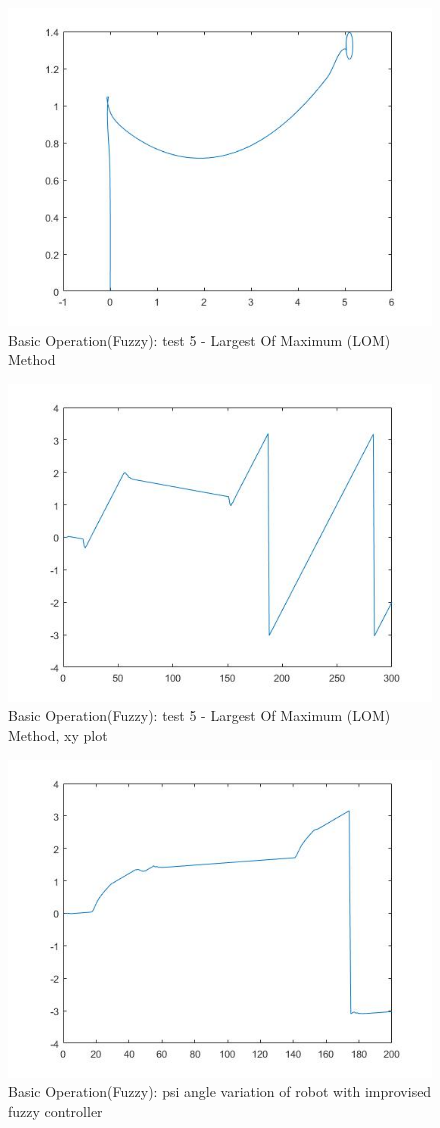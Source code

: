 \documentclass{l4proj}
\begin{document}
\begin{figure}[htb]
    \centering
    \includegraphics[width=0.5\linewidth]{images/lofig2.jpg}

    \caption{Basic Operation(Fuzzy): test 5 - Largest Of Maximum (LOM) Method}
    \label{fig:Model1sim4} 
\end{figure}
\begin{figure}[htb]
    \centering
    \includegraphics[width=0.5\linewidth]{images/lofig4.jpg}

    \caption{Basic Operation(Fuzzy): test 5 - Largest Of Maximum (LOM) Method, xy plot}
    \label{fig:Model1sim4} 
\end{figure}
\begin{figure}[htb]
    \centering
    \includegraphics[width=0.5\linewidth]{images/final psi plot.jpg}

    \caption{Basic Operation(Fuzzy): psi angle variation of robot with improvised fuzzy controller}
    \label{fig:Model1sim4} 
\end{figure}
\end{document}
